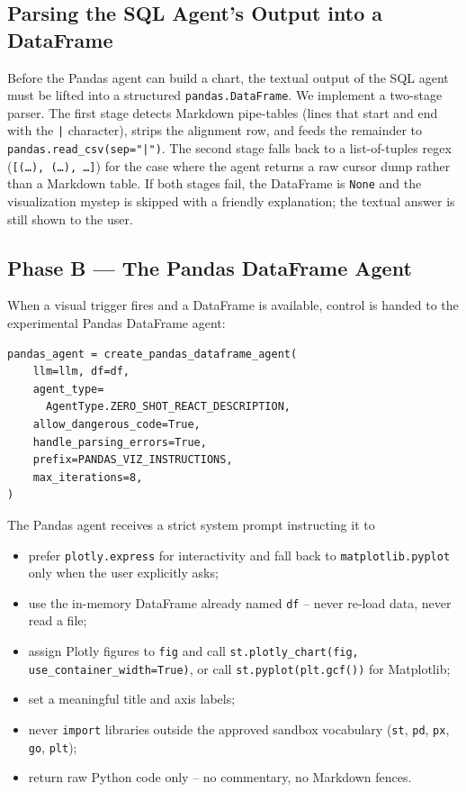 \documentclass[11pt,a4paper]{article}
\begin{document}
\subsection{Parsing the SQL Agent's Output into a DataFrame}

Before the Pandas agent can build a chart, the textual output of the
SQL agent must be lifted into a structured \texttt{pandas.DataFrame}.
We implement a two-stage parser. The first stage detects Markdown
pipe-tables (lines that start and end with the \texttt{|}
character), strips the alignment row, and feeds the remainder to
\texttt{pandas.read\_csv(sep="|")}. The second stage falls back to a
list-of-tuples regex (\texttt{[(\ldots), (\ldots), \ldots]}) for the
case where the agent returns a raw cursor dump rather than a Markdown
table. If both stages fail, the DataFrame is \texttt{None} and the
visualization mystep is skipped with a friendly explanation; the textual
answer is still shown to the user.

\subsection{Phase B --- The Pandas DataFrame Agent}

When a visual trigger fires and a DataFrame is available, control is
handed to the experimental Pandas DataFrame agent:
\begin{lstlisting}
pandas_agent = create_pandas_dataframe_agent(
    llm=llm, df=df,
    agent_type=
      AgentType.ZERO_SHOT_REACT_DESCRIPTION,
    allow_dangerous_code=True,
    handle_parsing_errors=True,
    prefix=PANDAS_VIZ_INSTRUCTIONS,
    max_iterations=8,
)
\end{lstlisting}
The Pandas agent receives a strict system prompt instructing it to
\begin{itemize}
  \item prefer \texttt{plotly.express} for interactivity and fall back
        to \texttt{matplotlib.pyplot} only when the user explicitly
        asks;
  \item use the in-memory DataFrame already named \texttt{df} -- never
        re-load data, never read a file;
  \item assign Plotly figures to \texttt{fig} and call
        \texttt{st.plotly\_chart(fig, use\_container\_width=True)}, or
        call \texttt{st.pyplot(plt.gcf())} for Matplotlib;
  \item set a meaningful title and axis labels;
  \item never \texttt{import} libraries outside the approved sandbox
        vocabulary (\texttt{st}, \texttt{pd}, \texttt{px}, \texttt{go},
        \texttt{plt});
  \item return raw Python code only -- no commentary, no Markdown
        fences.
\end{itemize}
\end{document}

